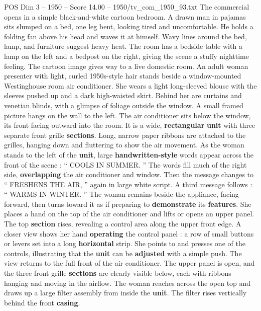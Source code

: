 \begin{textsample}{POS Dim 3 – 1950 – Score 14.00 – 1950/tv\_com\_1950\_93.txt}  \label{ex:f3_pos_009}
The commercial opens in a simple black-and-white cartoon bedroom.
A drawn man in pajamas sits slumped on a bed, one leg bent, looking tired and uncomfortable.
He holds a folding fan above his head and waves it at himself.
Wavy lines around the bed, lamp, and furniture suggest heavy heat.
The room has a bedside table with a lamp on the left and a bedpost on the right, giving the scene a stuffy nighttime feeling.
The cartoon image gives way to a live domestic room.
An adult woman presenter with light, curled 1950s-style hair stands beside a window-mounted Westinghouse room air conditioner.
She wears a light long-sleeved blouse with the sleeves pushed up and a dark high-waisted skirt.
Behind her are curtains and venetian blinds, with a glimpse of foliage outside the window.
A small framed picture hangs on the wall to the left.
The air conditioner sits below the window, its front facing outward into the room.
It is a wide, \textbf{rectangular} \textbf{unit} with three separate front grille \textbf{sections}.
Long, narrow paper ribbons are attached to the grilles, hanging down and fluttering to show the air movement.
As the woman stands to the left of the \textbf{unit}, large \textbf{handwritten-style} words appear across the front of the scene : “ COOLS IN SUMMER. ” The words fill much of the right side, \textbf{overlapping} the air conditioner and window.
Then the message changes to “ FRESHENS THE AIR, ” again in large white script.
A third message follows : “ WARMS IN WINTER. ” The woman remains beside the appliance, facing forward, then turns toward it as if preparing to \textbf{demonstrate} its \textbf{features}.
She places a hand on the top of the air conditioner and lifts or opens an upper panel.
The top \textbf{section} rises, revealing a control area along the upper front edge.
A closer view shows her hand \textbf{operating} the control panel : a row of small buttons or levers set into a long \textbf{horizontal} strip.
She points to and presses one of the controls, illustrating that the \textbf{unit} can be \textbf{adjusted} with a simple push.
The view returns to the full front of the air conditioner.
The upper panel is open, and the three front grille \textbf{sections} are clearly visible below, each with ribbons hanging and moving in the airflow.
The woman reaches across the open top and draws up a large filter assembly from inside the \textbf{unit}.
The filter rises vertically behind the front \textbf{casing}.

\end{textsample}
